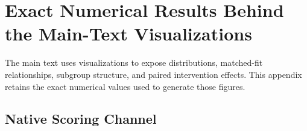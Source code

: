 
\section{Exact Numerical Results Behind the Main-Text Visualizations}
\label{app:numeric_visualizations}

The main text uses visualizations to expose distributions, matched-fit
relationships, subgroup structure, and paired intervention effects. This
appendix retains the exact numerical values used to generate those figures.

\subsection{Native Scoring Channel}

\begin{table}[t]
    \centering
    \small
    \setlength{\tabcolsep}{3.6pt}
    \renewcommand{\arraystretch}{1.10}
    \caption{Exact numerical values corresponding to
    Fig.~\ref{fig:native_scoring_channel}. $N_{\mathrm{eff}}$ is the effective
    number of score levels and Sens. measures score variation across fixed
    prompt paraphrases.}
    \label{tab:native_channel_numeric}
\end{table}

